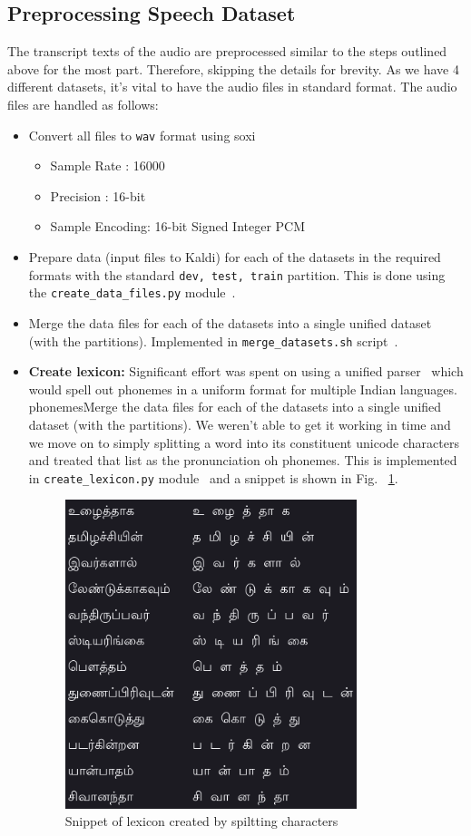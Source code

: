 \documentclass[11pt]{article} \usepackage{spconf,amsmath,graphicx}
\begin{document}
\subsection{Preprocessing Speech Dataset}
The transcript texts of the audio are preprocessed similar to the steps outlined above for the most part. Therefore, skipping the details for brevity.
As we have 4 different datasets, it's vital to have the audio files in standard format. The audio files are handled as follows:
\begin{itemize}
	\item Convert all files to \texttt{wav} format using soxi 
	\begin{itemize}
		\item Sample Rate : 16000
		\item Precision : 16-bit
		\item Sample Encoding: 16-bit Signed Integer PCM
	\end{itemize}
	\item Prepare data (input files to Kaldi) for each of the datasets in the required formats with the standard \texttt{dev, test, train} partition.
	This is done using the \texttt{create\_data\_files.py} module~\cite{createfiles}.
	\item Merge the data files for each of the datasets into a single unified dataset (with the partitions). Implemented in \texttt{merge\_datasets.sh} script~\cite{mergedb}.
	\item \textbf{Create lexicon:} Significant effort was spent on using a unified parser~\cite{baby2016unified} which would spell out phonemes in a uniform format for multiple Indian languages.  phonemesMerge the data files for each of the datasets into a single unified dataset (with the partitions). 
	We weren't able to get it working in time and we move on to simply splitting a word into its constituent unicode characters and treated that list as the pronunciation oh phonemes.
	This is implemented in \texttt{create\_lexicon.py} module~\cite{createlexicon} and a snippet is shown in Fig. ~\ref{fig:lexicon}.
	\begin{figure}[h]

	\includegraphics[width=8.5cm]{lexicon} \caption{Snippet of lexicon created by spiltting characters} \label{fig:lexicon}


\end{figure}
\end{itemize}
\end{document}
